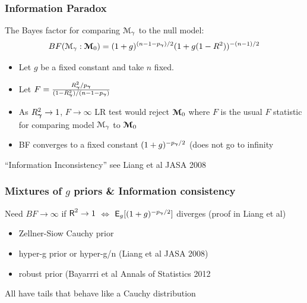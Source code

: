 \documentclass[]{beamer}
\begin{document}
\begin{frame}
  \frametitle{Information Paradox}
  
The Bayes factor for comparing ${\cal M}_\gamma$ to the null
model:
$$
 BF({\cal M}_\gamma : \boldsymbol{{\cal M}}_0) =    (1 + g)^{(n - 1 - p_{\boldsymbol{\gamma}})/2} (1 + g(1 - R^2))^{-(n-1)/2}
$$
\pause
\begin{itemize}
\item Let $g$ be a fixed constant and take $n$ fixed. \pause
\item Let $F = \frac{R_{\boldsymbol{\gamma}}^2/p_{\boldsymbol{\gamma}}}{(1 - R_{\boldsymbol{\gamma}}^2)/(n - 1 - p_{\boldsymbol{\gamma}})}$ \pause
\item As $R^2_{\boldsymbol{\gamma}} \to 1$, $F \to \infty$ LR test would reject $\boldsymbol{{\cal M}}_0$
  where $F$ is the usual $F$ statistic for  comparing model ${\cal M}_\gamma$ to
  $\boldsymbol{{\cal M}}_0$ \pause 
\item BF converges to a fixed constant $(1+g)^{-p_{\boldsymbol{\gamma}}/2}$  (does not go
  to infinity
\end{itemize}

``Information Inconsistency''  see Liang et al JASA 2008


\end{frame}
\begin{frame}
  \frametitle{Mixtures of $g$ priors \& Information consistency}
  
Need $BF \to \infty$ if $\textsf{R}^2 \to 1$  $\Leftrightarrow$ $\textsf{E}_g[(1 +
g)^{-p_{\boldsymbol{\gamma}}/2}]$ diverges  (proof in Liang et al)
\pause
\begin{itemize}
\item Zellner-Siow Cauchy prior \pause
\item hyper-g prior or hyper-g/n (Liang et al JASA 2008) \pause
\item robust prior (Bayarrri et al Annals of Statistics 2012 \pause
\end{itemize}

 All have tails that behave like a Cauchy distribution
\end{frame}
\end{document}
